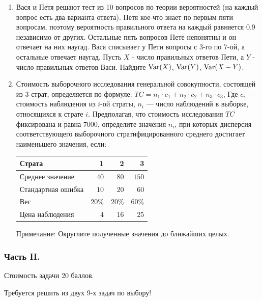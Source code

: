 \begin{enumerate}
\item Вася и Петя решают тест из 10 вопросов по теории вероятностей (на каждый
вопрос есть два варианта ответа). Петя кое-что знает по первым пяти вопросам,
поэтому вероятность правильного ответа на каждый равняется $0.9$ независимо от
других. Остальные пять вопросов Пете непонятны и он отвечает на них наугад. Вася
списывает у Пети вопросы с 3-го по 7-ой, а остальные отвечает наугад.
Пусть $X$ - число правильных ответов Пети, а $Y$ - число правильных ответов Васи.
Найдите $\operatorname{Var}(X)$, $\operatorname{Var}(Y)$, $\operatorname{Var}(X-Y)$.

\item Стоимость выборочного исследования генеральной совокупности, состоящей из
3 страт, определяется по формуле: $TC=n_{1}\cdot c_{1}+n_{2}\cdot c_{2}+n_{3}\cdot c_{3}$,
Где $c_{i}$ — стоимость наблюдения из $i$-ой страты, $n_{i}$ — число наблюдений
в выборке, относящихся к страте $i$. Предполагая, что стоимость исследования $TC$
фиксирована и равна 7000, определите значения $n_{i}$, при которых дисперсия
соответствующего выборочного стратифицированного среднего достигает наименьшего
значения, если:

\begin{center}
\begin{tabular}{@{}lrrr@{}}
\toprule
Страта             & 1     & 2     & 3     \\ \midrule
Среднее значение   & $40$  & $80$  & $150$ \\
Стандартная ошибка & $10$  & $20$  & $60$  \\
Вес                & $20\%$ & $20\%$ & $60\%$ \\
Цена наблюдения    & $4$   & $16$  & $25$  \\ \bottomrule
\end{tabular}
\end{center}

Примечание: Округлите полученные значения до ближайших целых.
\end{enumerate}

\subsubsection*{Часть II.}

Стоимость задачи 20 баллов.

Требуется решить \textbf{} из двух 9-х задач по выбору!

